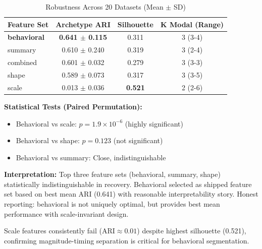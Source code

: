 \begin{table}[h]
\centering
\small
\caption{Robustness Across 20 Datasets (Mean $\pm$ SD)}
\label{tab:robustness}
\begin{tabular}{@{}lccc@{}}
\toprule
Feature Set & Archetype ARI & Silhouette & K Modal (Range) \\
\midrule
\textbf{behavioral} & \textbf{0.641 $\pm$ 0.115} & 0.311 & 3 (3-4) \\
summary & 0.610 $\pm$ 0.240 & 0.319 & 3 (2-4) \\
combined & 0.601 $\pm$ 0.032 & 0.279 & 3 (3-3) \\
shape & 0.589 $\pm$ 0.073 & 0.317 & 3 (3-5) \\
scale & 0.013 $\pm$ 0.036 & \textbf{0.521} & 2 (2-6) \\
\bottomrule
\end{tabular}
\end{table}

\textbf{Statistical Tests (Paired Permutation):}
\begin{itemize}
    \item Behavioral vs scale: $p = 1.9 \times 10^{-6}$ (highly significant)
    \item Behavioral vs shape: $p = 0.123$ (not significant)
    \item Behavioral vs summary: Close, indistinguishable
\end{itemize}

\textbf{Interpretation:} Top three feature sets (behavioral, summary, shape) statistically indistinguishable in recovery. Behavioral selected as shipped feature set based on best mean ARI (0.641) with reasonable interpretability story. Honest reporting: behavioral is not uniquely optimal, but provides best mean performance with scale-invariant design.

Scale features consistently fail ($\text{ARI} \approx 0.01$) despite highest silhouette (0.521), confirming magnitude-timing separation is critical for behavioral segmentation.
